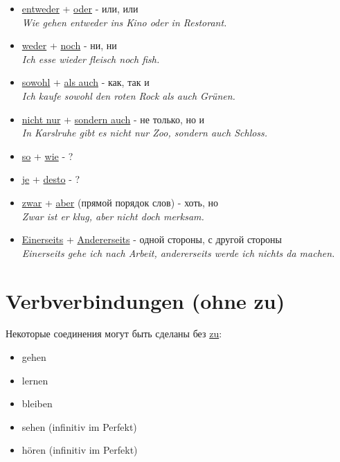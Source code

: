 \documentclass[12pt,a4paper]{report}
\newcommand{\satzew}[1]{\underline{#1}}
\newcommand{\ubersatze}[1]{\textit{#1}}
\begin{document}
\begin{itemize}
\item \satzew{entweder} + \satzew{oder} - или, или
~\\ \ubersatze{Wie gehen entweder ins Kino oder in Restorant.}
\item \satzew{weder} + \satzew{noch} - ни, ни
~\\ \ubersatze{Ich esse wieder fleisch noch fish.}
\item \satzew{sowohl} + \satzew{als auch} - как, так и
~\\ \ubersatze{Ich kaufe sowohl den roten Rock als auch Grünen.}
\item \satzew{nicht nur} + \satzew{sondern auch} - не только, но и
~\\ \ubersatze{In Karslruhe gibt es nicht nur Zoo, sondern auch Schloss.}
\item \satzew{so} + \satzew{wie} - ?
\item \satzew{je} + \satzew{desto} - ?
\item \satzew{zwar} + \satzew{aber} (прямой порядок слов) - хоть, но
~\\ \ubersatze{Zwar ist er klug, aber nicht doch merksam.}
\item \satzew{Einerseits} + \satzew{Andererseits} -  одной стороны, с другой стороны
~\\ \ubersatze{Einerseits gehe ich nach Arbeit, andererseits werde ich nichts da machen.}
\end{itemize}

\chapter{Verbverbindungen (ohne zu)}

Некоторые соединения могут быть сделаны без \satzew{zu}:
\begin{itemize}
    \item gehen
    \item lernen
    \item bleiben
    \item sehen (infinitiv im Perfekt)
    \item hören (infinitiv im Perfekt)
\end{itemize}
\end{document}
